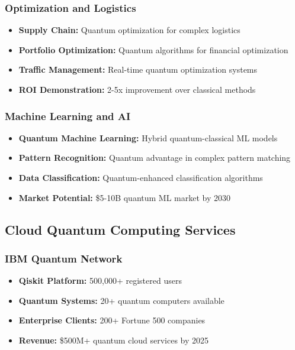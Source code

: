 \documentclass[12pt,a4paper]{article}
\begin{document}
\subsubsection{Optimization and Logistics}
\begin{itemize}
    \item \textbf{Supply Chain:} Quantum optimization for complex logistics
    \item \textbf{Portfolio Optimization:} Quantum algorithms for financial optimization
    \item \textbf{Traffic Management:} Real-time quantum optimization systems
    \item \textbf{ROI Demonstration:} 2-5x improvement over classical methods
\end{itemize}

\subsubsection{Machine Learning and AI}
\begin{itemize}
    \item \textbf{Quantum Machine Learning:} Hybrid quantum-classical ML models
    \item \textbf{Pattern Recognition:} Quantum advantage in complex pattern matching
    \item \textbf{Data Classification:} Quantum-enhanced classification algorithms
    \item \textbf{Market Potential:} \$5-10B quantum ML market by 2030
\end{itemize}

\subsection{Cloud Quantum Computing Services}

\subsubsection{IBM Quantum Network}
\begin{itemize}
    \item \textbf{Qiskit Platform:} 500,000+ registered users
    \item \textbf{Quantum Systems:} 20+ quantum computers available
    \item \textbf{Enterprise Clients:} 200+ Fortune 500 companies
    \item \textbf{Revenue:} \$500M+ quantum cloud services by 2025
\end{itemize}
\end{document}
